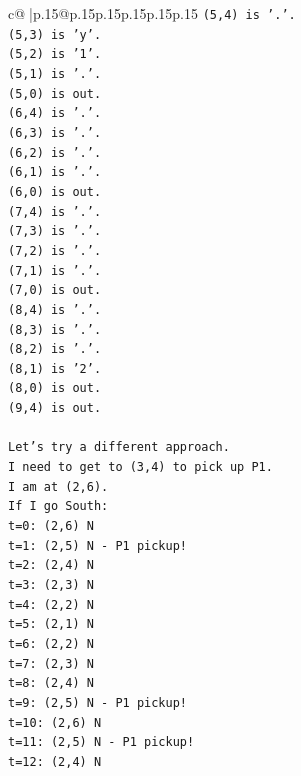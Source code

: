 \documentclass{article}
\begin{document}
{\begin{supertabular}{c@{$\;$}|p{.15\linewidth}@{}p{.15\linewidth}p{.15\linewidth}p{.15\linewidth}p{.15\linewidth}p{.15\linewidth}}
{{{\texttt{(5,4) is '.'.} \\
\texttt{(5,3) is 'y'.} \\
\texttt{(5,2) is '1'.} \\
\texttt{(5,1) is '.'.} \\
\texttt{(5,0) is out.} \\
\texttt{(6,4) is '.'.} \\
\texttt{(6,3) is '.'.} \\
\texttt{(6,2) is '.'.} \\
\texttt{(6,1) is '.'.} \\
\texttt{(6,0) is out.} \\
\texttt{(7,4) is '.'.} \\
\texttt{(7,3) is '.'.} \\
\texttt{(7,2) is '.'.} \\
\texttt{(7,1) is '.'.} \\
\texttt{(7,0) is out.} \\
\texttt{(8,4) is '.'.} \\
\texttt{(8,3) is '.'.} \\
\texttt{(8,2) is '.'.} \\
\texttt{(8,1) is '2'.} \\
\texttt{(8,0) is out.} \\
\texttt{(9,4) is out.} \\
\\ 
\texttt{Let's try a different approach.} \\
\texttt{I need to get to (3,4) to pick up P1.} \\
\texttt{I am at (2,6).} \\
\texttt{If I go South:} \\
\texttt{t=0: (2,6) N} \\
\texttt{t=1: (2,5) N {-} P1 pickup!} \\
\texttt{t=2: (2,4) N} \\
\texttt{t=3: (2,3) N} \\
\texttt{t=4: (2,2) N} \\
\texttt{t=5: (2,1) N} \\
\texttt{t=6: (2,2) N} \\
\texttt{t=7: (2,3) N} \\
\texttt{t=8: (2,4) N} \\
\texttt{t=9: (2,5) N {-} P1 pickup!} \\
\texttt{t=10: (2,6) N} \\
\texttt{t=11: (2,5) N {-} P1 pickup!} \\
\texttt{t=12: (2,4) N} \\
}}}
\end{supertabular}}
\end{document}
